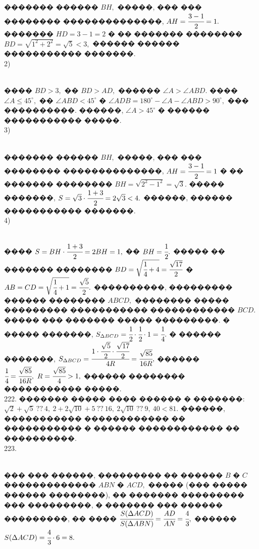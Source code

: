 \documentclass[12pt]{article}
\begin{document}
������� ������ $BH,$ �����, ��� ��� �������� ��������������, $AH=\cfrac{3-1}{2}=1.$ ������� $HD=3-1=2$ � �� ������� �������� $BD=\sqrt{1^2+2^2}=\sqrt{5}<3,$ ������ ������ ����������� �������.\\
2) \begin{figure}[ht!]
\end{figure}\\
���� $BD>3,$ �� $BD>AD,$ ������ $\angle A>\angle ABD.$ ���� $\angle A\leqslant 45^\circ,$ �� $\angle ABD<45^\circ$ � $\angle ADB=180^\circ-\angle A-\angle ABD>90^\circ,$ ��� ����������. ������, $\angle A>45^\circ$ � ������ ����������� �����.\\
3) \begin{figure}[ht!]
\end{figure}\\
������� ������ $BH,$ �����, ��� ��� �������� ��������������, $AH=\cfrac{3-1}{2}=1$ � �� ������� �������� $BH=\sqrt{2^2-1^2}=\sqrt{3}.$ ����� �������, $S=\sqrt{3}\cdot\cfrac{1+3}{2}=2\sqrt{3}<4.$ ������, ������ ����������� �������.\\
4) \begin{figure}[ht!]
\end{figure}\\
���� $S=BH\cdot\cfrac{1+3}{2}=2BH=1,$ �� $BH=\cfrac{1}{2}.$ ����� �� ������� �������� $BD=\sqrt{\cfrac{1}{4}+4}=\cfrac{\sqrt{17}}{2}$ � $AB=CD=\sqrt{\cfrac{1}{4}+1}=\cfrac{\sqrt{5}}{2}.$ ����������, ��������� ������ �������� $ABCD,$ �������� ����� ��������� ����������� ������������ $BCD.$ ����� ��� ������� ����� ���������. � ����� �������, $S_{\Delta BCD}=\cfrac{1}{2}\cdot\cfrac{1}{2}\cdot1=\cfrac{1}{4}.$ � ������ �������, $S_{\Delta BCD}=\cfrac{1\cdot\cfrac{\sqrt{5}}{2}\cdot\cfrac{\sqrt{17}}{2}}{4R}=\cfrac{\sqrt{85}}{16R},$ ������ $\cfrac{1}{4}=\cfrac{\sqrt{85}}{16R},\ R=\cfrac{\sqrt{85}}{4}>1,$ ������ �������� ����������� �����.\\
222. ������� ����� ���� ������ � �������: $\sqrt{2}+\sqrt{5}\ ??\ 4,\ 2+2\sqrt{10}+5\ ??\ 16,\ 2\sqrt{10}\ ??\ 9,\ 40<81.$ ������, ����������� ������������ �� ����������� � ������ ������������ �� ����������.\\
223. \begin{figure}[ht!]
\end{figure}\\
��� ��� ������, ��������� �� ������ $B$ � $C$ ������������� $ABN$ � $ACD,$ ����� (��� ����� ������ ��������), �� ������� ��������� ��� ���������, � ������� ��� ������ ���������, �� ���� $\cfrac{S(\Delta ACD)}{S(\Delta ABN)}=\cfrac{AD}{AN}=\cfrac{4}{3},$ ������ $S(\Delta ACD)=\cfrac{4}{3}\cdot6=8.$\\
\end{document}
